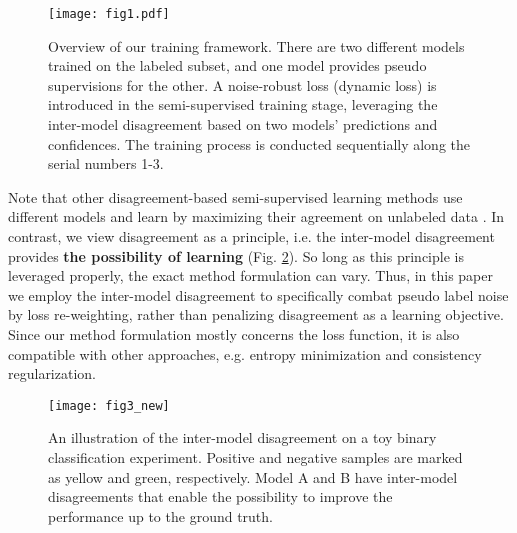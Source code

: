 \documentclass[preprint,review,10pt]{elsarticle}
\begin{document}
\begin{figure}[t]
\centering
\texttt{[image: fig1.pdf]}
\caption{Overview of our training framework. There are two different models trained on the labeled subset, and one model provides pseudo supervisions for the other. A noise-robust loss (dynamic loss) is introduced in the semi-supervised training stage, leveraging the inter-model disagreement based on two models' predictions and confidences. The training process is conducted sequentially along the serial numbers 1-3. }
\label{fig1}
\end{figure}

Note that other disagreement-based semi-supervised learning methods use different models and learn by maximizing their agreement on unlabeled data \cite{qiao2018deep,peng2020deep}. In contrast, we view disagreement \cite{zhou2010semi} as a principle, i.e. the inter-model disagreement provides \textbf{the possibility of learning} (Fig. \ref{fig3}). So long as this principle is leveraged properly, the exact method formulation can vary. Thus, in this paper we employ the inter-model disagreement to specifically combat pseudo label noise by loss re-weighting, rather than penalizing disagreement as a learning objective. Since our method formulation mostly concerns the loss function, it is also compatible with other approaches, e.g. entropy minimization and consistency regularization.


\begin{figure}[t]
\centering
\texttt{[image: fig3\_new]}
\caption{An illustration of the inter-model disagreement on a toy binary classification experiment. Positive and negative samples are marked as yellow and green, respectively. Model A and B have inter-model disagreements that enable the possibility to improve the performance up to the ground truth. }
\label{fig3}
\end{figure}
\end{document}
